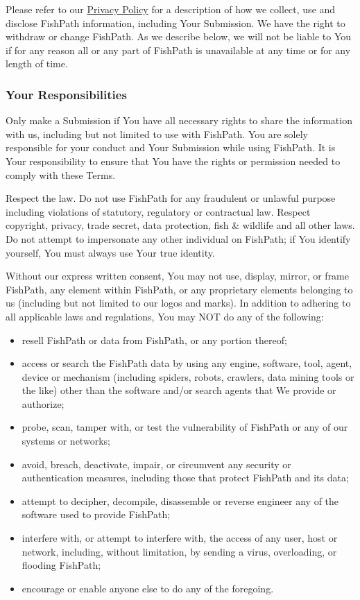 \documentclass[
  11pt,
]{book}
\providecommand{\tightlist}{%
  \setlength{\itemsep}{0pt}\setlength{\parskip}{0pt}}
\begin{document}
Please refer to our \href{https://www.nature.org/en-us/about-us/who-we-are/accountability/privacy-policy/}{Privacy Policy} for a description of how we collect, use and disclose FishPath information, including Your Submission. We have the right to withdraw or change FishPath. As we describe below, we will not be liable to You if for any reason all or any part of FishPath is unavailable at any time or for any length of time.

\hypertarget{your-responsibilities}{%
\subsubsection*{Your Responsibilities}\label{your-responsibilities}}

Only make a Submission if You have all necessary rights to share the information with us, including but not limited to use with FishPath. You are solely responsible for your conduct and Your Submission while using FishPath. It is Your responsibility to ensure that You have the rights or permission needed to comply with these Terms.

Respect the law. Do not use FishPath for any fraudulent or unlawful purpose including violations of statutory, regulatory or contractual law. Respect copyright, privacy, trade secret, data protection, fish \& wildlife and all other laws. Do not attempt to impersonate any other individual on FishPath; if You identify yourself, You must always use Your true identity.

Without our express written consent, You may not use, display, mirror, or frame FishPath, any element within FishPath, or any proprietary elements belonging to us (including but not limited to our logos and marks). In addition to adhering to all applicable laws and regulations, You may NOT do any of the following:

\begin{itemize}
\tightlist
\item
  resell FishPath or data from FishPath, or any portion thereof;
\item
  access or search the FishPath data by using any engine, software, tool, agent, device or mechanism (including spiders, robots, crawlers, data mining tools or the like) other than the software and/or search agents that We provide or authorize;
\item
  probe, scan, tamper with, or test the vulnerability of FishPath or any of our systems or networks;
\item
  avoid, breach, deactivate, impair, or circumvent any security or authentication measures, including those that protect FishPath and its data;
\item
  attempt to decipher, decompile, disassemble or reverse engineer any of the software used to provide FishPath;
\item
  interfere with, or attempt to interfere with, the access of any user, host or network, including, without limitation, by sending a virus, overloading, or flooding FishPath;
\item
  encourage or enable anyone else to do any of the foregoing.
\end{itemize}
\end{document}
